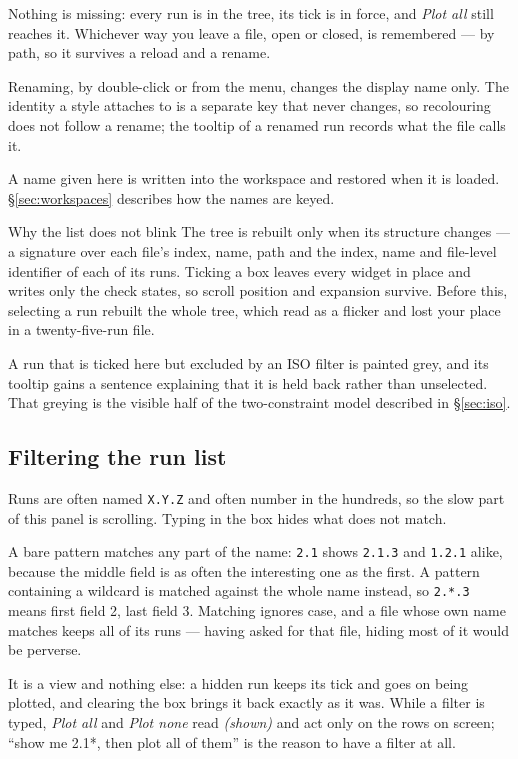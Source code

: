 \documentclass[11pt,a4paper,oneside]{report}
\newcommand{\code}[1]{\texttt{#1}}
\begin{document}
Nothing is missing: every run is in the tree, its tick is in force, and
\emph{Plot all} still reaches it. Whichever way you leave a file, open or
closed, is remembered --- by path, so it survives a reload and a rename.

Renaming, by double-click or from the menu, changes the display name only. The
identity a style attaches to is a separate key that never changes, so
recolouring does not follow a rename; the tooltip of a renamed run records what
the file calls it.

A name given here is written into the workspace and restored when it is loaded.
\S\ref{sec:workspaces} describes how the names are keyed.

\begin{aoenote}{Why the list does not blink}
The tree is rebuilt only when its structure changes --- a signature over each
file's index, name, path and the index, name and file-level identifier of each of
its runs. Ticking a box leaves every widget in place and writes only the check
states, so scroll position and expansion survive. Before this, selecting a run
rebuilt the whole tree, which read as a flicker and lost your place in a
twenty-five-run file.
\end{aoenote}

A run that is ticked here but excluded by an ISO filter is painted grey, and its
tooltip gains a sentence explaining that it is held back rather than unselected.
That greying is the visible half of the two-constraint model described in
\S\ref{sec:iso}.

\subsection{Filtering the run list}


Runs are often named \code{X.Y.Z} and often number in the hundreds, so the slow
part of this panel is scrolling. Typing in the box hides what does not match.

A bare pattern matches any part of the name: \code{2.1} shows \code{2.1.3} and
\code{1.2.1} alike, because the middle field is as often the interesting one as
the first. A pattern containing a wildcard is matched against the whole name
instead, so \code{2.*.3} means first field 2, last field 3. Matching ignores
case, and a file whose own name matches keeps all of its runs --- having asked
for that file, hiding most of it would be perverse.

It is a view and nothing else: a hidden run keeps its tick and goes on being
plotted, and clearing the box brings it back exactly as it was. While a filter
is typed, \emph{Plot all} and \emph{Plot none} read \emph{(shown)} and act only
on the rows on screen; ``show me 2.1*, then plot all of them'' is the reason to
have a filter at all.
\end{document}
